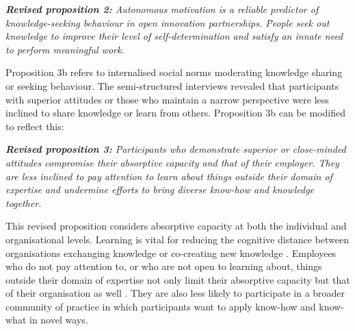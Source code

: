 \begin{tcolorbox}
\textit{\textbf{Revised proposition 2:} Autonomous motivation is a reliable predictor of knowledge-seeking behaviour in open innovation partnerships. People seek out knowledge to improve their level of self-determination and satisfy an innate need to perform meaningful work.}
\end{tcolorbox}

Proposition 3b refers to internalised social norms moderating knowledge sharing or seeking behaviour. The semi-structured interviews revealed that participants with superior attitudes or those who maintain a narrow perspective were less inclined to share knowledge or learn from others. Proposition 3b can be modified to reflect this: \bigskip

\begin{tcolorbox}
\textit{\textbf{Revised proposition 3:} Participants who demonstrate superior or close-minded attitudes compromise their absorptive capacity and that of their employer. They are less inclined to pay attention to learn about things outside their domain of expertise and undermine efforts to bring diverse know-how and knowledge together.}
\end{tcolorbox}

This revised proposition considers absorptive capacity at both the individual and organisational levels. Learning is vital for reducing the cognitive distance between organisations exchanging knowledge or co-creating new knowledge \citep{nooteboom2000learning}. Employees who do not pay attention to, or who are not open to learning about, things outside their domain of expertise not only limit their absorptive capacity but that of their organisation as well \citep{yildiz2019fosters}. They are also less likely to participate in a broader community of practice in which participants want to apply know-how and know-what in novel ways. \medskip

